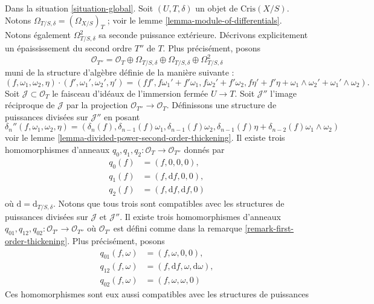 \begin{remark}
\label{remark-second-order-thickening}
Dans la situation \ref{situation-global}.
Soit $(U, T, \delta)$ un objet de $\text{Cris}(X/S)$.
Notons $\Omega_{T/S, \delta} = (\Omega_{X/S})_T$ ; voir le
lemme \ref{lemma-module-of-differentials}.
Notons également $\Omega^2_{T/S, \delta}$ sa seconde puissance
extérieure. Décrivons explicitement un épaississement du second ordre $T''$ de $T$.
Plus précisément, posons
$$
\mathcal{O}_{T''} =
\mathcal{O}_T \oplus \Omega_{T/S, \delta} \oplus \Omega_{T/S, \delta}
\oplus \Omega^2_{T/S, \delta}
$$
muni de la structure d'algèbre définie de la manière suivante :
$$
(f, \omega_1, \omega_2, \eta) \cdot
(f', \omega_1', \omega_2', \eta') =
(ff', f\omega_1' + f'\omega_1, f\omega_2' + f'\omega_2,
f\eta' + f'\eta + \omega_1 \wedge \omega_2' + \omega_1' \wedge \omega_2).
$$
Soit $\mathcal{J} \subset \mathcal{O}_T$
le faisceau d'idéaux de l'immersion fermée $U \to T$. Soit
$\mathcal{J}''$ l'image réciproque de $\mathcal{J}$ par la
projection $\mathcal{O}_{T''} \to \mathcal{O}_T$.
Définissons une structure de puissances divisées sur $\mathcal{J}''$ en posant
$$
\delta_n''(f, \omega_1, \omega_2, \eta) =
(\delta_n(f), \delta_{n - 1}(f)\omega_1, \delta_{n - 1}(f)\omega_2,
\delta_{n - 1}(f)\eta + \delta_{n - 2}(f)\omega_1 \wedge \omega_2)
$$
voir le lemme \ref{lemma-divided-power-second-order-thickening}.
Il existe trois homomorphismes d'anneaux
$q_0, q_1, q_2 : \mathcal{O}_T \to \mathcal{O}_{T''}$
donnés par
\begin{align*}
q_0(f) & = (f, 0, 0, 0), \\
q_1(f) & = (f, \text{d}f, 0, 0), \\
q_2(f) & = (f, \text{d}f, \text{d}f, 0)
\end{align*}
où $\text{d} = \text{d}_{T/S, \delta}$.
Notons que tous trois sont compatibles avec les structures de puissances divisées
sur $\mathcal{J}$ et $\mathcal{J}''$. Il existe trois homomorphismes d'anneaux
$q_{01}, q_{12}, q_{02} : \mathcal{O}_{T'} \to \mathcal{O}_{T''}$
où $\mathcal{O}_{T'}$ est défini comme dans la remarque \ref{remark-first-order-thickening}.
Plus précisément, posons
\begin{align*}
q_{01}(f, \omega) & = (f, \omega, 0, 0), \\
q_{12}(f, \omega) & =
(f, \text{d}f, \omega, \text{d}\omega), \\
q_{02}(f, \omega) & = (f, \omega, \omega, 0)
\end{align*}
Ces homomorphismes sont eux aussi compatibles avec les structures de puissances

\end{remark}
